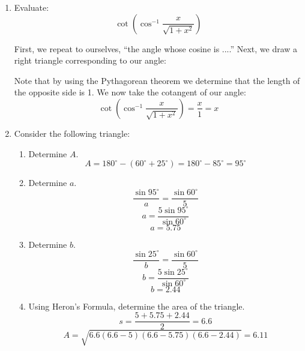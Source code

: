 \documentclass[letterpaper,12pt,fleqn]{article}
\renewcommand{\o}{\theta}
\begin{document}
\begin{enumerate}
\bigskip

\item Evaluate:
  \[\cot\left(\cos^{-1}\frac{x}{\sqrt{1+x^2}}\right)\]

  First, we repeat to ourselves, ``the angle whose cosine is ....'' Next, we
  draw a right triangle corresponding to our angle:

  \begin{figure}[h]
  \setlength{\leftskip}{1in}
  \end{figure}

  Note that by using the Pythagorean theorem we determine that the length of
  the opposite side is 1.  We now take the cotangent of our angle:
  \[\cot\left(\cos^{-1}\frac{x}{\sqrt{1+x^2}}\right)=\frac{x}{1}=x\]

\item Consider the following triangle:

\bigskip

\begin{figure}[h]
\setlength{\leftskip}{0.5in}
\end{figure}

\begin{enumerate}
\item Determine $A$.
  \[A=180^{\circ}-(60^{\circ}+25^{\circ})=180^{\circ}-85^{\circ}=95^{\circ}\]
  
\item Determine $a$.
  \[\frac{\sin{95^{\circ}}}{a}=\frac{\sin{60^{\circ}}}{5}\]
  \[a=\frac{5\sin{95^{\circ}}}{\sin{60^{\circ}}}\]
  \[a=5.75\]
    
\item Determine $b$.
  \[\frac{\sin{25^{\circ}}}{b}=\frac{\sin{60^{\circ}}}{5}\]
  \[b=\frac{5\sin{25^{\circ}}}{\sin{60^{\circ}}}\]
  \[b=2.44\]

\item Using Heron's Formula, determine the area of the triangle.
  \[s=\frac{5+5.75+2.44}{2}=6.6\]
  \[A=\sqrt{6.6(6.6-5)(6.6-5.75)(6.6-2.44)}=6.11\]
\end{enumerate}
\end{enumerate}
\end{document}
